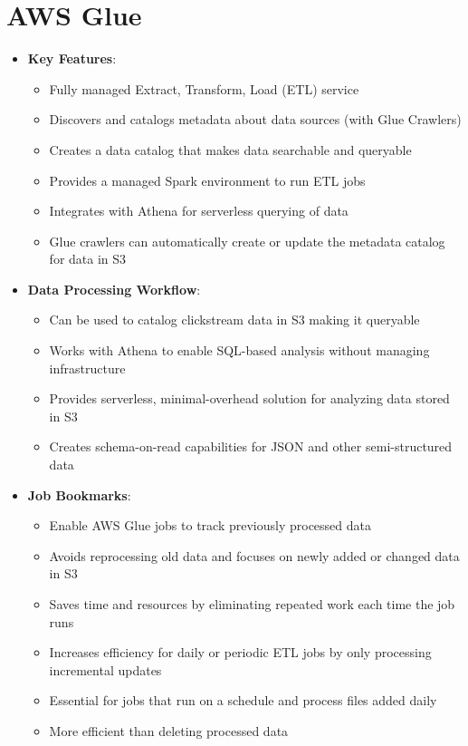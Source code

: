 \documentclass[11pt,a4paper]{report}
\begin{document}
\section{AWS Glue}

\begin{itemize}
  \item \textbf{Key Features}:
\begin{itemize}
  \item Fully managed Extract, Transform, Load (ETL) service
  \item Discovers and catalogs metadata about data sources (with Glue Crawlers)
  \item Creates a data catalog that makes data searchable and queryable
  \item Provides a managed Spark environment to run ETL jobs
  \item Integrates with Athena for serverless querying of data
  \item Glue crawlers can automatically create or update the metadata catalog for data in S3
\end{itemize}
  \item \textbf{Data Processing Workflow}:
\begin{itemize}
  \item Can be used to catalog clickstream data in S3 making it queryable
  \item Works with Athena to enable SQL-based analysis without managing infrastructure
  \item Provides serverless, minimal-overhead solution for analyzing data stored in S3
  \item Creates schema-on-read capabilities for JSON and other semi-structured data
\end{itemize}
  \item \textbf{Job Bookmarks}:
\begin{itemize}
  \item Enable AWS Glue jobs to track previously processed data
  \item Avoids reprocessing old data and focuses on newly added or changed data in S3
  \item Saves time and resources by eliminating repeated work each time the job runs
  \item Increases efficiency for daily or periodic ETL jobs by only processing incremental updates
  \item Essential for jobs that run on a schedule and process files added daily
  \item More efficient than deleting processed data

\end{itemize}
\end{itemize}
\end{document}
